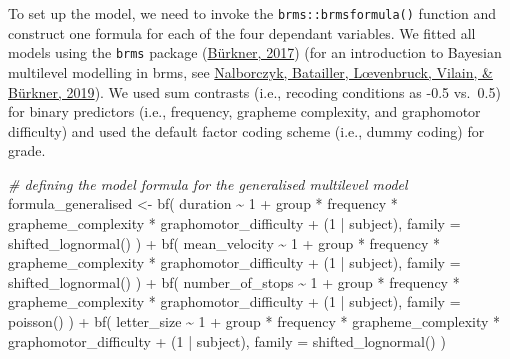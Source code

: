 \documentclass[
  11pt,
  english,
  ,doc,floatsintext]{apa6}
\newenvironment{Shaded}{}{}
\newcommand{\AttributeTok}[1]{\textcolor[rgb]{0.49,0.56,0.16}{#1}}
\newcommand{\CommentTok}[1]{\textcolor[rgb]{0.38,0.63,0.69}{\textit{#1}}}
\newcommand{\DecValTok}[1]{\textcolor[rgb]{0.25,0.63,0.44}{#1}}
\newcommand{\FunctionTok}[1]{\textcolor[rgb]{0.02,0.16,0.49}{#1}}
\newcommand{\NormalTok}[1]{#1}
\newcommand{\OtherTok}[1]{\textcolor[rgb]{0.00,0.44,0.13}{#1}}
\newcommand{\SpecialCharTok}[1]{\textcolor[rgb]{0.25,0.44,0.63}{#1}}
\begin{document}
To set up the model, we need to invoke the \texttt{brms::brmsformula()} function and construct one formula for each of the four dependant variables. We fitted all models using the \texttt{brms} package (\protect\hyperlink{ref-R-brms_a}{Bürkner, 2017}) (for an introduction to Bayesian multilevel modelling in brms, see \protect\hyperlink{ref-nalborczyk_introduction_2019}{Nalborczyk, Batailler, Lœvenbruck, Vilain, \& Bürkner, 2019}). We used sum contrasts (i.e., recoding conditions as -0.5 vs.~0.5) for binary predictors (i.e., frequency, grapheme complexity, and graphomotor difficulty) and used the default factor coding scheme (i.e., dummy coding) for grade.

\begin{Shaded}
\begin{Highlighting}[]
\CommentTok{\# defining the model formula for the generalised multilevel model}
\NormalTok{formula\_generalised }\OtherTok{\textless{}{-}}
    \FunctionTok{bf}\NormalTok{(}
\NormalTok{        duration }\SpecialCharTok{\textasciitilde{}} \DecValTok{1} \SpecialCharTok{+}\NormalTok{ group }\SpecialCharTok{*}\NormalTok{ frequency }\SpecialCharTok{*}\NormalTok{ grapheme\_complexity }\SpecialCharTok{*}
\NormalTok{            graphomotor\_difficulty }\SpecialCharTok{+}\NormalTok{ (}\DecValTok{1} \SpecialCharTok{|}\NormalTok{ subject),}
        \AttributeTok{family =} \FunctionTok{shifted\_lognormal}\NormalTok{()}
\NormalTok{        ) }\SpecialCharTok{+}
    \FunctionTok{bf}\NormalTok{(}
\NormalTok{        mean\_velocity }\SpecialCharTok{\textasciitilde{}} \DecValTok{1} \SpecialCharTok{+}\NormalTok{ group }\SpecialCharTok{*}\NormalTok{ frequency }\SpecialCharTok{*}\NormalTok{ grapheme\_complexity }\SpecialCharTok{*}
\NormalTok{            graphomotor\_difficulty }\SpecialCharTok{+}\NormalTok{ (}\DecValTok{1} \SpecialCharTok{|}\NormalTok{ subject),}
        \AttributeTok{family =} \FunctionTok{shifted\_lognormal}\NormalTok{()}
\NormalTok{        ) }\SpecialCharTok{+}
    \FunctionTok{bf}\NormalTok{(}
\NormalTok{        number\_of\_stops }\SpecialCharTok{\textasciitilde{}} \DecValTok{1} \SpecialCharTok{+}\NormalTok{ group }\SpecialCharTok{*}\NormalTok{ frequency }\SpecialCharTok{*}\NormalTok{ grapheme\_complexity }\SpecialCharTok{*}
\NormalTok{            graphomotor\_difficulty }\SpecialCharTok{+}\NormalTok{ (}\DecValTok{1} \SpecialCharTok{|}\NormalTok{ subject),}
        \AttributeTok{family =} \FunctionTok{poisson}\NormalTok{()}
\NormalTok{        ) }\SpecialCharTok{+}
    \FunctionTok{bf}\NormalTok{(}
\NormalTok{        letter\_size }\SpecialCharTok{\textasciitilde{}} \DecValTok{1} \SpecialCharTok{+}\NormalTok{ group }\SpecialCharTok{*}\NormalTok{ frequency }\SpecialCharTok{*}\NormalTok{ grapheme\_complexity }\SpecialCharTok{*}
\NormalTok{            graphomotor\_difficulty }\SpecialCharTok{+}\NormalTok{ (}\DecValTok{1} \SpecialCharTok{|}\NormalTok{ subject),}
        \AttributeTok{family =} \FunctionTok{shifted\_lognormal}\NormalTok{()}
\NormalTok{        )}


\end{Highlighting}
\end{Shaded}
\end{document}
